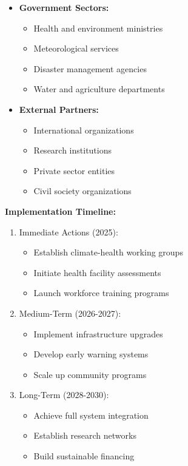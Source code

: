 \begin{itemize}
    \item \textbf{Government Sectors:}
    \begin{itemize}
        \item Health and environment ministries
        \item Meteorological services
        \item Disaster management agencies
        \item Water and agriculture departments
    \end{itemize}
    
    \item \textbf{External Partners:}
    \begin{itemize}
        \item International organizations
        \item Research institutions
        \item Private sector entities
        \item Civil society organizations
    \end{itemize}
\end{itemize}

\begin{recommendation}
\textbf{Implementation Timeline:}
\begin{enumerate}
    \item Immediate Actions (2025):
    \begin{itemize}
        \item Establish climate-health working groups
        \item Initiate health facility assessments
        \item Launch workforce training programs
    \end{itemize}
    
    \item Medium-Term (2026-2027):
    \begin{itemize}
        \item Implement infrastructure upgrades
        \item Develop early warning systems
        \item Scale up community programs
    \end{itemize}
    
    \item Long-Term (2028-2030):
    \begin{itemize}
        \item Achieve full system integration
        \item Establish research networks
        \item Build sustainable financing
    \end{itemize}
\end{enumerate}
\end{recommendation}

